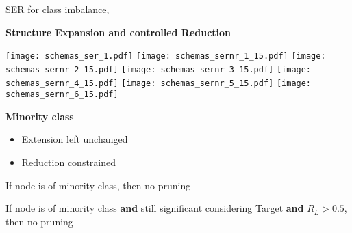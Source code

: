 \begin{frame}{SER for class imbalance}{\serr, \serll}
\begin{minipage}[t]{0.49\linewidth}
    \vspace{0pt}
    
    \centering
    \textbf{Structure Expansion and controlled Reduction}\\
        
    \renewcommand{\ratio}{0.8}
    \begin{overprint}
        \texttt{[image: schemas\_ser\_1.pdf]}
        \texttt{[image: schemas\_sernr\_1\_15.pdf]}
        \texttt{[image: schemas\_sernr\_2\_15.pdf]}
        \texttt{[image: schemas\_sernr\_3\_15.pdf]}
        \texttt{[image: schemas\_sernr\_4\_15.pdf]}
        \texttt{[image: schemas\_sernr\_5\_15.pdf]}
        \texttt{[image: schemas\_sernr\_6\_15.pdf]}
    \end{overprint}
    \pause
    \textcolor{mygreen}{\textbf{Minority class}}
\end{minipage}\hfill
\begin{minipage}[t]{0.49\linewidth}
    \vspace{0pt}
    \vspace{1.5cm}
    \begin{itemize}
    \pause \pause
    \item Extension left unchanged
    \pause
    \item Reduction constrained
    \end{itemize}
\begin{minipage}[t]{0.49\linewidth}
    \vspace{0pt}
    \begin{tcolorbox}[title=\serr,size=title,boxrule=0.2pt]
    If node is of minority class, then no pruning
    \end{tcolorbox}
\end{minipage}
\begin{minipage}[t]{0.49\linewidth}
    \vspace{0pt}
    \begin{tcolorbox}[title=\serll,size=title,boxrule=0.2pt]
    If node is of minority class \textbf{and} still significant considering Target \textbf{and} $R_L > 0.5$, then no pruning
    \end{tcolorbox}
\end{minipage}


    

\end{minipage}

\end{frame}

